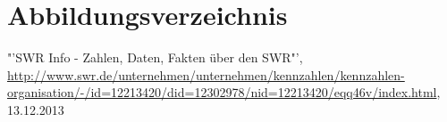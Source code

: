 \pagebreak
\section{Abbildungsverzeichnis}

\listoffigures


\clearpage
{}

\lstlistoflistings


\begin{thebibliography}{xxxxxxxxxxxxxxxxxxx}
 "'SWR Info - Zahlen, Daten, Fakten über den SWR"', \url{http://www.swr.de/unternehmen/unternehmen/kennzahlen/kennzahlen-organisation/-/id=12213420/did=12302978/nid=12213420/eqq46v/index.html}, 13.12.2013
\end{thebibliography}







